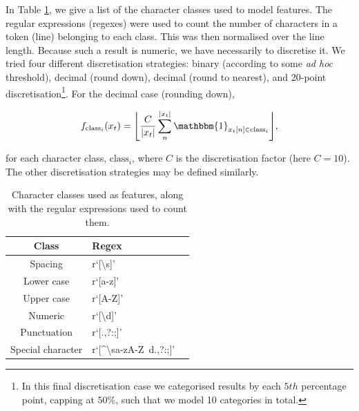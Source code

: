 In Table \ref{table:characterclasses}, we give a list of the character classes used to model features. The regular expressions (regexes) were used to count the number  of characters in a token (line) belonging to each class. This was then normalised over the line length. Because such a result is numeric, we have necessarily to discretise it. We tried four different discretisation strategies: binary (according to some \emph{ad hoc} threshold), decimal (round down), decimal (round to nearest), and 20-point discretisation\footnote{In this final discretisation case we categorised results by each $5th$ percentage point, capping at $50\%$, such that we model 10 categories in total.}. For the decimal case (rounding down),

\begin{equation}
f_{\text{class}_i}(x_t) = \Bigg\lfloor \frac{C}{|x_t|}\sum_n^{|x_t|} \mathbbm{1}_{x_t[n] \in \text{class}_i} \Bigg\rfloor,
\label{eq:classfunctions}
\end{equation}

for each character class, $\text{class}_i$, where $C$ is the discretisation factor (here $C = 10$). The other discretisation strategies may be defined similarly.

\begin{table}[h]
\begin{center}
\begin{tabular}{|c|l|l|}
\hline
Class & Regex\\
\hline
Spacing & r`[\textbackslash s]'\\
Lower case & r`[a-z]'\\
Upper case & r`[A-Z]'\\
Numeric & r`[\textbackslash d]'\\
Punctuation & r`[\(\).,?:;]'\\
Special character & r`[\^{}\textbackslash sa-zA-Z\ d\(\).,?:;]'\\
\hline
\end{tabular}
\caption[Character classes used as features, along with the regular expressions used to count them.]{Character classes used as features, along with the regular expressions used to count them.}
\label{table:characterclasses}
\end{center}
\end{table}

